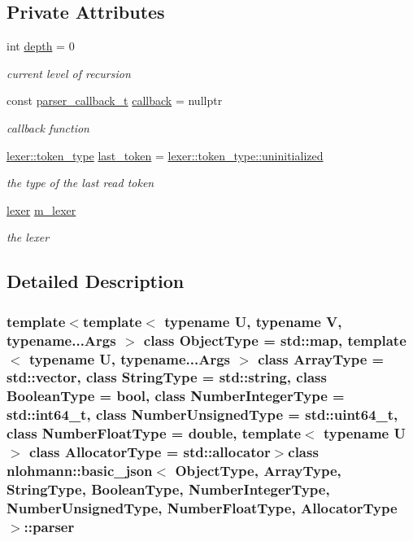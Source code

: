 \subsection*{Private Attributes}
\begin{DoxyCompactItemize}
\item 
int \hyperlink{classnlohmann_1_1basic__json_1_1parser_a8380d4d5ce79ab1ec9435c843fd40b07}{depth} = 0
\begin{DoxyCompactList}\small\item\em current level of recursion \end{DoxyCompactList}\item 
const \hyperlink{classnlohmann_1_1basic__json_a9e35475e2027520a78e09f460dbe048a}{parser\+\_\+callback\+\_\+t} \hyperlink{classnlohmann_1_1basic__json_1_1parser_a1ddac33be60094b071f95a1010382654}{callback} = nullptr
\begin{DoxyCompactList}\small\item\em callback function \end{DoxyCompactList}\item 
\hyperlink{classnlohmann_1_1basic__json_1_1lexer_a96887d6cd131e3d3a85a9d71fbdbcdf7}{lexer\+::token\+\_\+type} \hyperlink{classnlohmann_1_1basic__json_1_1parser_adfb1017b95ae14e52c585e1296e8faac}{last\+\_\+token} = \hyperlink{classnlohmann_1_1basic__json_1_1lexer_a96887d6cd131e3d3a85a9d71fbdbcdf7a42dd1a73d072bb6bf3f494f22b15db8e}{lexer\+::token\+\_\+type\+::uninitialized}
\begin{DoxyCompactList}\small\item\em the type of the last read token \end{DoxyCompactList}\item 
\hyperlink{classnlohmann_1_1basic__json_1_1lexer}{lexer} \hyperlink{classnlohmann_1_1basic__json_1_1parser_ae07b3100692718072e199c6e2a8e1e1b}{m\+\_\+lexer}
\begin{DoxyCompactList}\small\item\em the lexer \end{DoxyCompactList}\end{DoxyCompactItemize}


\subsection{Detailed Description}
\subsubsection*{template$<$template$<$ typename U, typename V, typename...\+Args $>$ class Object\+Type = std\+::map, template$<$ typename U, typename...\+Args $>$ class Array\+Type = std\+::vector, class String\+Type = std\+::string, class Boolean\+Type = bool, class Number\+Integer\+Type = std\+::int64\+\_\+t, class Number\+Unsigned\+Type = std\+::uint64\+\_\+t, class Number\+Float\+Type = double, template$<$ typename U $>$ class Allocator\+Type = std\+::allocator$>$class nlohmann\+::basic\+\_\+json$<$ Object\+Type, Array\+Type, String\+Type, Boolean\+Type, Number\+Integer\+Type, Number\+Unsigned\+Type, Number\+Float\+Type, Allocator\+Type $>$\+::parser}

